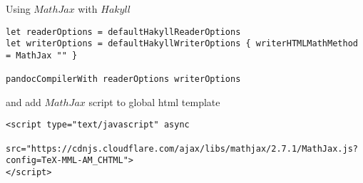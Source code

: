 \documentclass{minimal}
\begin{document}
Using $MathJax$ with $Hakyll$

\begin{verbatim}
let readerOptions = defaultHakyllReaderOptions
let writerOptions = defaultHakyllWriterOptions { writerHTMLMathMethod = MathJax "" }

pandocCompilerWith readerOptions writerOptions

\end{verbatim}

and add $MathJax$ script to global html template

\begin{verbatim}
<script type="text/javascript" async
        src="https://cdnjs.cloudflare.com/ajax/libs/mathjax/2.7.1/MathJax.js?config=TeX-MML-AM_CHTML">
</script>

\end{verbatim}
\end{document}
